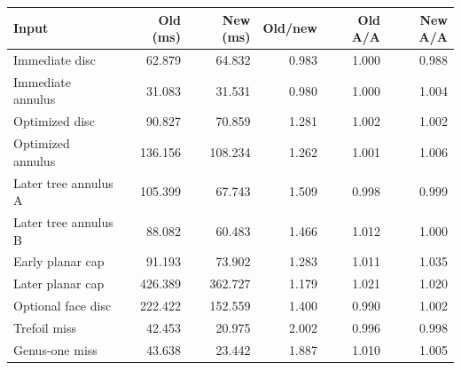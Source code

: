 \begin{tabular}{lrrrrr}
\toprule
Input & Old (ms) & New (ms) & Old/new & Old A/A & New A/A \\
\midrule
Immediate disc & 62.879 & 64.832 & 0.983 & 1.000 & 0.988 \\
Immediate annulus & 31.083 & 31.531 & 0.980 & 1.000 & 1.004 \\
Optimized disc & 90.827 & 70.859 & 1.281 & 1.002 & 1.002 \\
Optimized annulus & 136.156 & 108.234 & 1.262 & 1.001 & 1.006 \\
Later tree annulus A & 105.399 & 67.743 & 1.509 & 0.998 & 0.999 \\
Later tree annulus B & 88.082 & 60.483 & 1.466 & 1.012 & 1.000 \\
Early planar cap & 91.193 & 73.902 & 1.283 & 1.011 & 1.035 \\
Later planar cap & 426.389 & 362.727 & 1.179 & 1.021 & 1.020 \\
Optional face disc & 222.422 & 152.559 & 1.400 & 0.990 & 1.002 \\
Trefoil miss & 42.453 & 20.975 & 2.002 & 0.996 & 0.998 \\
Genus-one miss & 43.638 & 23.442 & 1.887 & 1.010 & 1.005 \\
\bottomrule
\end{tabular}
